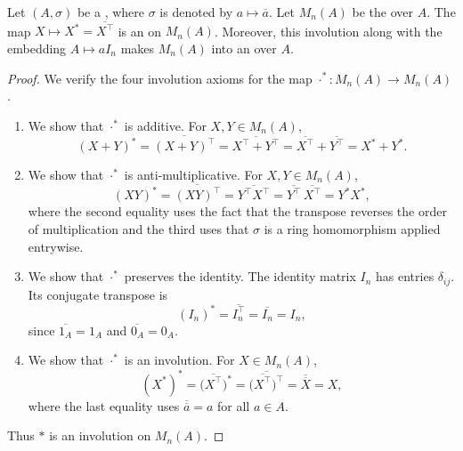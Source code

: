 \begin{proposition} \label{proposition:matrix_algebra_over_involution_ring_is_involution_algebra_over_a_ring_with_involution}
    Let $(A,\sigma)$ be a , where $\sigma$ is denoted by $a \mapsto \overline{a}$.
    Let $M_n(A)$ be the  over $A$.
    The map $X \mapsto X^* = \overline{X^\top}$ is an  on $M_n(A)$.
    Moreover, this involution along with the embedding $A \mapsto aI_n$ makes $M_n(A)$ into an  over $A$.
\end{proposition}
\begin{proof}
    We verify the four involution axioms for the map $\cdot^*: M_n(A) \to M_n(A)$.

    \begin{enumerate}
        \item We show that $\cdot^*$ is additive. For $X,Y \in M_n(A)$,
        $$(X+Y)^* = \overline{(X+Y)^\top} = \overline{X^\top + Y^\top} = \overline{X^\top} + \overline{Y^\top} = X^* + Y^*.$$

        \item 
        We show that $\cdot^*$ is anti-multiplicative. For $X,Y \in M_n(A)$,
        $$(XY)^* = \overline{(XY)^\top} = \overline{Y^\top X^\top} = \overline{Y^\top}\,\overline{X^\top} = Y^* X^*,$$
        where the second equality uses the fact that the transpose reverses the order of multiplication and the third uses that $\sigma$ is a ring homomorphism applied entrywise.

        \item 
        We show that $\cdot^*$ preserves the identity.
        The identity matrix $I_n$ has entries $\delta_{ij}$. Its conjugate transpose is
        $$(I_n)^* = \overline{I_n^\top} = \overline{I_n} = I_n,$$
        since $\overline{1_A} = 1_A$ and $\overline{0_A} = 0_A$.

        \item  
        We show that $\cdot^*$ is an involution.
        For $X \in M_n(A)$,
        $$(X^*)^* = \bigl( \overline{X^\top} \bigr)^* = \overline{\bigl( \overline{X^\top} \bigr)^\top} = \overline{\overline{X}} = X,$$
        where the last equality uses $\overline{\overline{a}} = a$ for all $a \in A$.
    \end{enumerate}
    Thus $*$ is an involution on $M_n(A)$.


\end{proof}
